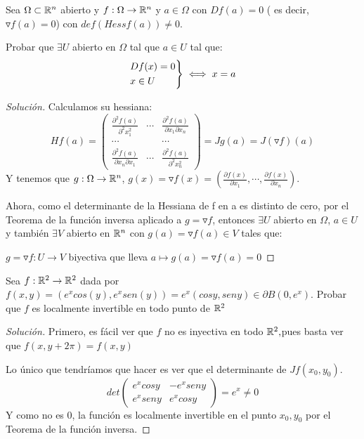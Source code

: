 \begin{ejer}
	Sea $\Omega \subset \mathbb{R}^n$ abierto y $f:\Omega \to \mathbb{R}^n$ y $a\in \Omega$ con $Df(a) = 0$ ( es decir, $\triangledown f(a) = 0$) con $def(Hess f(a)) \ne 0$.

	Probar que $\exists U$ abierto en $\Omega$ tal que $a \in U$ tal que:
	\[
	\begin{rcases}
	Df(x) = 0\\
	x \in U
\end{rcases} \iff x = a
	\]
\end{ejer}
\begin{proof}[Solución]
	Calculamos su hessiana:
	\[
	Hf(a) = \begin{pmatrix} \frac{\partial^2f(a)}{\partial^2x_1^2}& \cdots & \frac{\partial^2f(a)}{\partial x_1 \partial x_n} \\ \cdots & & \cdots \\ \frac{\partial^2f(a)}{\partial x_n \partial x_1}& \cdots & \frac{\partial^2f(a)}{\partial^2x_n^2} \end{pmatrix} = Jg(a) = J(\triangledown f)(a)
	\]
Y tenemos que $g:\Omega \to \mathbb{R}^n$, $g(x) = \triangledown f(x) = ( \frac{\partial f(x)}{\partial x_1}, \cdots , \frac{\partial f(x)}{\partial x_n})$.

Ahora, como el determinante de la Hessiana de f en a es distinto de cero, por el Teorema de la función inversa aplicado a $g =  \triangledown f$, entonces $\exists U$ abierto en $\Omega$, $a\in U$ y también $\exists V$ abierto en $\mathbb{R}^n$ con $g(a) =  \triangledown f(a) \in V$
tales que:

$g = \triangledown f: U \to V$ biyectiva que lleva $a \mapsto g(a) =  \triangledown f(a) = 0$


\end{proof}
\begin{ejer}
	Sea $f:\mathbb{R}^2 \to \mathbb{R}^2$ dada por $f(x,y) = (e^x cos(y),e^x sen(y)) = e^x(cosy,seny) \in \partial B(0,e^x)$. Probar que $f$ es localmente invertible en todo punto de $\mathbb{R}^2$
\end{ejer}
\begin{proof}[Solución]
	Primero, es fácil ver que $f$ no es inyectiva en todo $\mathbb{R}^2,$pues basta ver que $f(x,y+2\pi) = f(x,y)$

	Lo único que tendríamos que hacer es ver que el determinante de $Jf (x_0,y_0)$.
	\[
det \begin{pmatrix} e^x cosy & -e^xseny \\ e^x seny & e^x cos y \end{pmatrix}  = e^x \ne 0
	\]
	Y como no es 0, la función es localmente invertible en el punto $x_0,y_0$ por el Teorema de la función inversa.

\end{proof}
